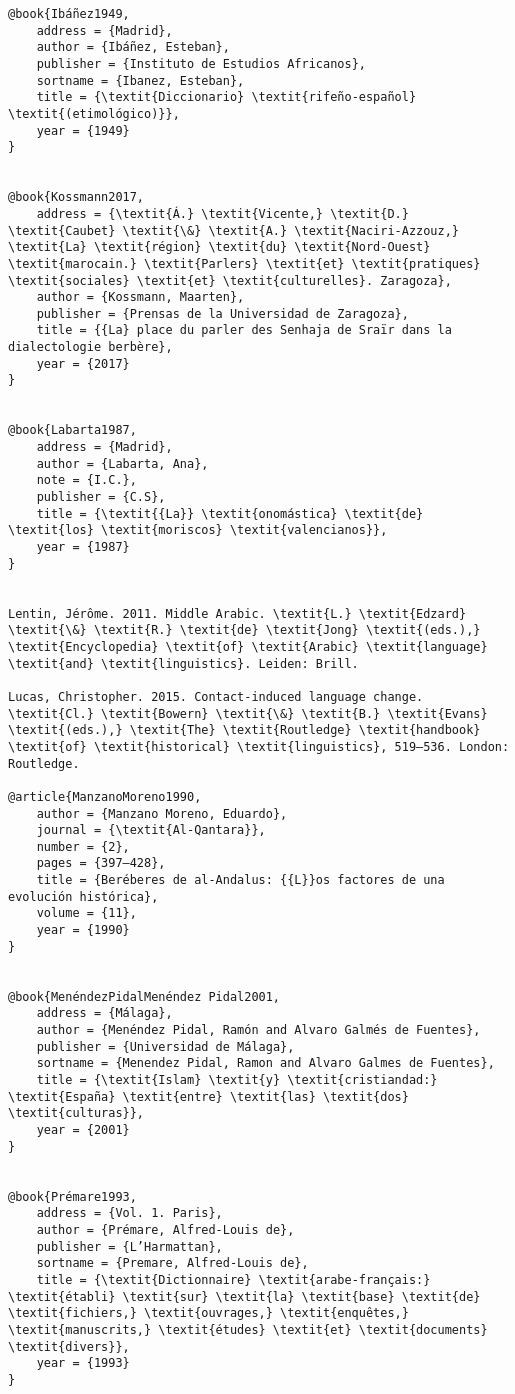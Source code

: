 \documentclass[output=paper,modfonts,nonflat]{langsci/langscibook}
\begin{document}
\begin{verbatim}
@book{Ibáñez1949,
	address = {Madrid},
	author = {Ibáñez, Esteban},
	publisher = {Instituto de Estudios Africanos},
	sortname = {Ibanez, Esteban},
	title = {\textit{Diccionario} \textit{rifeño-español} \textit{(etimológico)}},
	year = {1949}
}


@book{Kossmann2017,
	address = {\textit{Á.} \textit{Vicente,} \textit{D.} \textit{Caubet} \textit{\&} \textit{A.} \textit{Naciri-Azzouz,} \textit{La} \textit{région} \textit{du} \textit{Nord-Ouest} \textit{marocain.} \textit{Parlers} \textit{et} \textit{pratiques} \textit{sociales} \textit{et} \textit{culturelles}. Zaragoza},
	author = {Kossmann, Maarten},
	publisher = {Prensas de la Universidad de Zaragoza},
	title = {{La} place du parler des Senhaja de Sraïr dans la dialectologie berbère},
	year = {2017}
}


@book{Labarta1987,
	address = {Madrid},
	author = {Labarta, Ana},
	note = {I.C.},
	publisher = {C.S},
	title = {\textit{{La}} \textit{onomástica} \textit{de} \textit{los} \textit{moriscos} \textit{valencianos}},
	year = {1987}
}


Lentin, Jérôme. 2011. Middle Arabic. \textit{L.} \textit{Edzard} \textit{\&} \textit{R.} \textit{de} \textit{Jong} \textit{(eds.),} \textit{Encyclopedia} \textit{of} \textit{Arabic} \textit{language} \textit{and} \textit{linguistics}. Leiden: Brill.

Lucas, Christopher. 2015. Contact-induced language change. \textit{Cl.} \textit{Bowern} \textit{\&} \textit{B.} \textit{Evans} \textit{(eds.),} \textit{The} \textit{Routledge} \textit{handbook} \textit{of} \textit{historical} \textit{linguistics}, 519–536. London: Routledge.

@article{ManzanoMoreno1990,
	author = {Manzano Moreno, Eduardo},
	journal = {\textit{Al-Qantara}},
	number = {2},
	pages = {397–428},
	title = {Beréberes de al-Andalus: {{L}}os factores de una evolución histórica},
	volume = {11},
	year = {1990}
}


@book{MenéndezPidalMenéndez Pidal2001,
	address = {Málaga},
	author = {Menéndez Pidal, Ramón and Alvaro Galmés de Fuentes},
	publisher = {Universidad de Málaga},
	sortname = {Menendez Pidal, Ramon and Alvaro Galmes de Fuentes},
	title = {\textit{Islam} \textit{y} \textit{cristiandad:} \textit{España} \textit{entre} \textit{las} \textit{dos} \textit{culturas}},
	year = {2001}
}


@book{Prémare1993,
	address = {Vol. 1. Paris},
	author = {Prémare, Alfred-Louis de},
	publisher = {L’Harmattan},
	sortname = {Premare, Alfred-Louis de},
	title = {\textit{Dictionnaire} \textit{arabe-français:} \textit{établi} \textit{sur} \textit{la} \textit{base} \textit{de} \textit{fichiers,} \textit{ouvrages,} \textit{enquêtes,} \textit{manuscrits,} \textit{études} \textit{et} \textit{documents} \textit{divers}},
	year = {1993}
}



\end{verbatim}
\end{document}
